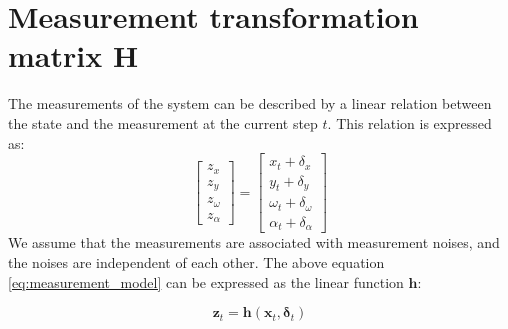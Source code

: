 \documentclass[12pt, a4paper]{article}
\begin{document}
\section{Measurement transformation matrix $\bm{H}$}
The measurements of the system can be described by a linear relation between the state and the measurement at the current step $t$. This relation is expressed as:
\begin{equation}
  \label{eq:measurement_model}
  \begin{bmatrix}
    z_{x}\\
    z_{y}\\
    z_{\omega}\\
    z_{\alpha}
  \end{bmatrix}=
  \begin{bmatrix}
    x_{t} + \delta_{x}\\
    y_{t} + \delta_{y}\\
    \omega_{t} + \delta_{\omega}\\
    \alpha_{t} + \delta_{\alpha}
  \end{bmatrix}
\end{equation}
We assume that the measurements are associated with measurement noises, and the noises are independent of each other. The above equation \eqref{eq:measurement_model} can be expressed as the linear function $\bm{h}$:

\[
  \bm{z}_{t} = \bm{h}(\bm{x}_{t}, \bm{\delta}_{t})
\]
\end{document}
